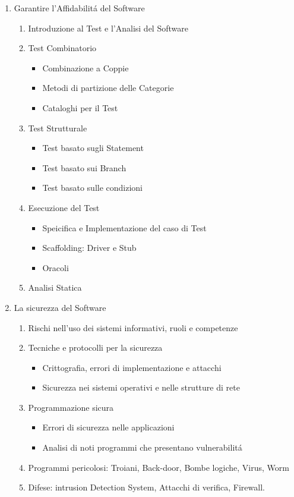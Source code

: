 \begin{enumerate}
	\item Garantire l'Affidabilitá del Software
	\begin{enumerate}
		\item Introduzione al Test e l'Analisi del Software
		\item Test Combinatorio
		\begin{itemize}
			\item Combinazione a Coppie
			\item Metodi di partizione delle Categorie
			\item Cataloghi per il Test
		\end{itemize}
		\item Test Strutturale
		\begin{itemize}
			\item Test basato sugli Statement
			\item Test basato sui Branch
			\item Test basato sulle condizioni
		\end{itemize}
		\item Esecuzione del Test
		\begin{itemize}
			\item Speicifica e Implementazione del caso di Test
			\item Scaffolding: Driver e Stub
			\item Oracoli
		\end{itemize}
		\item Analisi Statica
	\end{enumerate}
	\item La sicurezza del Software
	\begin{enumerate}
		\item Rischi nell'uso dei sistemi informativi, ruoli e competenze
		\item Tecniche e protocolli per la sicurezza
		\begin{itemize}
			\item Crittografia, errori di implementazione e attacchi
			\item Sicurezza nei sistemi operativi e nelle strutture di rete
		\end{itemize}
		\item Programmazione sicura
		\begin{itemize}
			\item Errori di sicurezza nelle applicazioni
			\item Analisi di noti programmi che presentano vulnerabilitá
		\end{itemize}
		\item Programmi pericolosi: Troiani, Back-door, Bombe logiche, Virus, Worm
		\item Difese: intrusion Detection System, Attacchi di verifica, Firewall.
	\end{enumerate}
\end{enumerate}